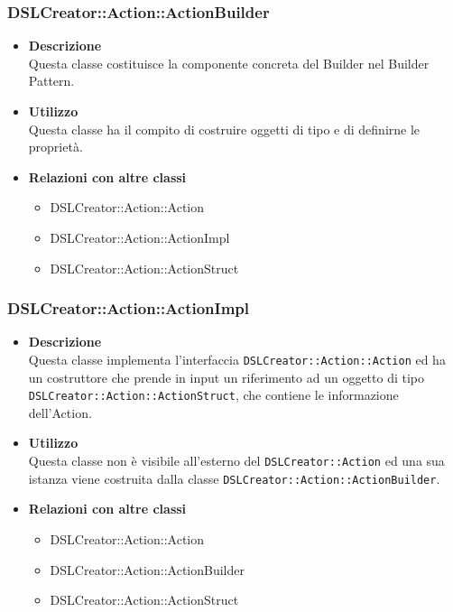  \subsubsection{DSLCreator::Action::ActionBuilder}
                    \begin{itemize}
                        \item \textbf{Descrizione} \hfill \\
                          Questa classe costituisce la componente concreta del Builder nel Builder Pattern.
                        \item \textbf{Utilizzo} \hfill \\
                          Questa classe ha il compito di costruire oggetti di tipo  e di definirne le proprietà.
                        \item \textbf{Relazioni con altre classi}
                            \begin{itemize}
                              \item DSLCreator::Action::Action
                              \item DSLCreator::Action::ActionImpl
                              \item DSLCreator::Action::ActionStruct
                            \end{itemize}
                    \end{itemize}  

 \subsubsection{DSLCreator::Action::ActionImpl}
                    \begin{itemize}
                        \item \textbf{Descrizione} \hfill \\
                          Questa classe implementa l'interfaccia \texttt{DSLCreator::Action::Action} ed ha un costruttore che prende in input un riferimento ad un oggetto di tipo \texttt{DSLCrea\-tor::Action::ActionStruct}, che contiene le informazione dell'Action.
                        \item \textbf{Utilizzo} \hfill \\
                          Questa classe non è visibile all'esterno del  \texttt{DSLCreator::Action} ed una sua istanza viene costruita dalla classe \texttt{DSLCreator::Action::ActionBuilder}.
                        \item \textbf{Relazioni con altre classi}
                            \begin{itemize}
                              \item DSLCreator::Action::Action
                              \item DSLCreator::Action::ActionBuilder
                              \item DSLCreator::Action::ActionStruct
                            \end{itemize}
                    \end{itemize}  

